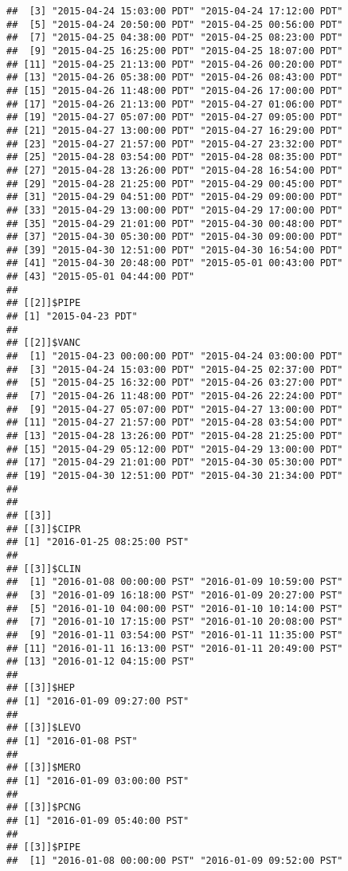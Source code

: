 \documentclass[]{article}
\begin{document}
\begin{verbatim}
##  [3] "2015-04-24 15:03:00 PDT" "2015-04-24 17:12:00 PDT"
##  [5] "2015-04-24 20:50:00 PDT" "2015-04-25 00:56:00 PDT"
##  [7] "2015-04-25 04:38:00 PDT" "2015-04-25 08:23:00 PDT"
##  [9] "2015-04-25 16:25:00 PDT" "2015-04-25 18:07:00 PDT"
## [11] "2015-04-25 21:13:00 PDT" "2015-04-26 00:20:00 PDT"
## [13] "2015-04-26 05:38:00 PDT" "2015-04-26 08:43:00 PDT"
## [15] "2015-04-26 11:48:00 PDT" "2015-04-26 17:00:00 PDT"
## [17] "2015-04-26 21:13:00 PDT" "2015-04-27 01:06:00 PDT"
## [19] "2015-04-27 05:07:00 PDT" "2015-04-27 09:05:00 PDT"
## [21] "2015-04-27 13:00:00 PDT" "2015-04-27 16:29:00 PDT"
## [23] "2015-04-27 21:57:00 PDT" "2015-04-27 23:32:00 PDT"
## [25] "2015-04-28 03:54:00 PDT" "2015-04-28 08:35:00 PDT"
## [27] "2015-04-28 13:26:00 PDT" "2015-04-28 16:54:00 PDT"
## [29] "2015-04-28 21:25:00 PDT" "2015-04-29 00:45:00 PDT"
## [31] "2015-04-29 04:51:00 PDT" "2015-04-29 09:00:00 PDT"
## [33] "2015-04-29 13:00:00 PDT" "2015-04-29 17:00:00 PDT"
## [35] "2015-04-29 21:01:00 PDT" "2015-04-30 00:48:00 PDT"
## [37] "2015-04-30 05:30:00 PDT" "2015-04-30 09:00:00 PDT"
## [39] "2015-04-30 12:51:00 PDT" "2015-04-30 16:54:00 PDT"
## [41] "2015-04-30 20:48:00 PDT" "2015-05-01 00:43:00 PDT"
## [43] "2015-05-01 04:44:00 PDT"
## 
## [[2]]$PIPE
## [1] "2015-04-23 PDT"
## 
## [[2]]$VANC
##  [1] "2015-04-23 00:00:00 PDT" "2015-04-24 03:00:00 PDT"
##  [3] "2015-04-24 15:03:00 PDT" "2015-04-25 02:37:00 PDT"
##  [5] "2015-04-25 16:32:00 PDT" "2015-04-26 03:27:00 PDT"
##  [7] "2015-04-26 11:48:00 PDT" "2015-04-26 22:24:00 PDT"
##  [9] "2015-04-27 05:07:00 PDT" "2015-04-27 13:00:00 PDT"
## [11] "2015-04-27 21:57:00 PDT" "2015-04-28 03:54:00 PDT"
## [13] "2015-04-28 13:26:00 PDT" "2015-04-28 21:25:00 PDT"
## [15] "2015-04-29 05:12:00 PDT" "2015-04-29 13:00:00 PDT"
## [17] "2015-04-29 21:01:00 PDT" "2015-04-30 05:30:00 PDT"
## [19] "2015-04-30 12:51:00 PDT" "2015-04-30 21:34:00 PDT"
## 
## 
## [[3]]
## [[3]]$CIPR
## [1] "2016-01-25 08:25:00 PST"
## 
## [[3]]$CLIN
##  [1] "2016-01-08 00:00:00 PST" "2016-01-09 10:59:00 PST"
##  [3] "2016-01-09 16:18:00 PST" "2016-01-09 20:27:00 PST"
##  [5] "2016-01-10 04:00:00 PST" "2016-01-10 10:14:00 PST"
##  [7] "2016-01-10 17:15:00 PST" "2016-01-10 20:08:00 PST"
##  [9] "2016-01-11 03:54:00 PST" "2016-01-11 11:35:00 PST"
## [11] "2016-01-11 16:13:00 PST" "2016-01-11 20:49:00 PST"
## [13] "2016-01-12 04:15:00 PST"
## 
## [[3]]$HEP
## [1] "2016-01-09 09:27:00 PST"
## 
## [[3]]$LEVO
## [1] "2016-01-08 PST"
## 
## [[3]]$MERO
## [1] "2016-01-09 03:00:00 PST"
## 
## [[3]]$PCNG
## [1] "2016-01-09 05:40:00 PST"
## 
## [[3]]$PIPE
##  [1] "2016-01-08 00:00:00 PST" "2016-01-09 09:52:00 PST"

\end{verbatim}
\end{document}

